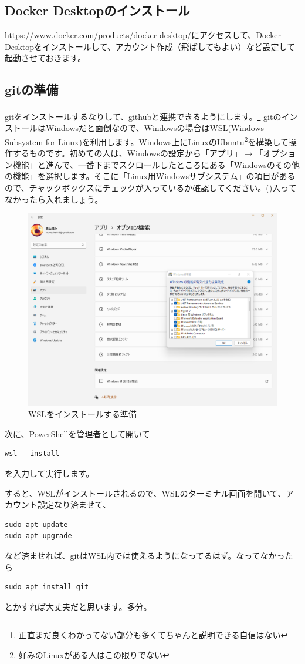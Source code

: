 \documentclass[../main]{subfiles}
\begin{document}
\subsection{Docker Desktopのインストール}
\url{https://www.docker.com/products/docker-desktop/}にアクセスして、Docker Desktopをインストールして、アカウント作成（飛ばしてもよい）など設定して起動させておきます。
\subsection{gitの準備}
gitをインストールするなりして、githubと連携できるようにします。\footnote{正直まだ良くわかってない部分も多くてちゃんと説明できる自信はない}
gitのインストールはWindowsだと面倒なので、Windowsの場合はWSL(Windows Subsystem for Linux)を利用します。Windows上にLinuxのUbuntu\footnote{好みのLinuxがある人はこの限りでない}を構築して操作するものです。初めての人は、Windowsの設定から「アプリ」$\rightarrow$「オプション機能」と進んで、一番下までスクロールしたところにある「Windowsのその他の機能」を選択します。そこに「Linux用Windowsサブシステム」の項目があるので、チャックボックスにチェックが入っているか確認してください。()入ってなかったら入れましょう。
\begin{figure}[H]
  \centering
  \includegraphics[width=.5\textwidth]{figures/ss274.png}
  \caption{WSLをインストールする準備}
  \label{fig:wsl}
\end{figure}
次に、PowerShellを管理者として開いて
\begin{lstlisting}
wsl --install
\end{lstlisting}
を入力して実行します。

すると、WSLがインストールされるので、WSLのターミナル画面を開いて、アカウント設定なり済ませて、
\begin{lstlisting}
sudo apt update
sudo apt upgrade
\end{lstlisting}
など済ませれば、gitはWSL内では使えるようになってるはず。なってなかったら
\begin{lstlisting}
sudo apt install git
\end{lstlisting}
とかすれば大丈夫だと思います。多分。
\end{document}
